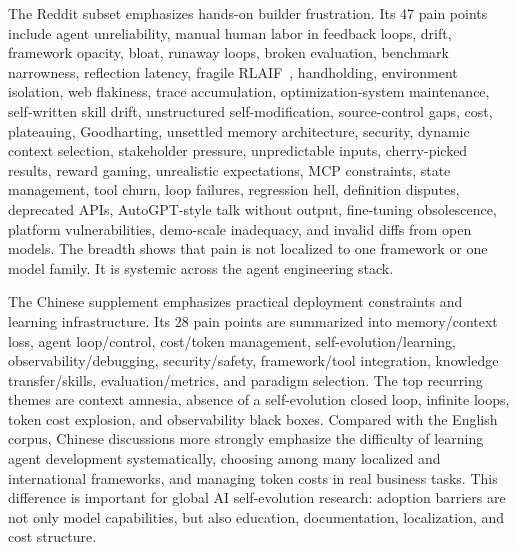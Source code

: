 The Reddit subset emphasizes hands-on builder frustration. Its 47 pain points include agent unreliability, manual human labor in feedback loops, drift, framework opacity, bloat, runaway loops, broken evaluation, benchmark narrowness, reflection latency, fragile RLAIF~\cite{constitutionalai2022}, handholding, environment isolation, web flakiness, trace accumulation, optimization-system maintenance, self-written skill drift, unstructured self-modification, source-control gaps, cost, plateauing, Goodharting, unsettled memory architecture, security, dynamic context selection, stakeholder pressure, unpredictable inputs, cherry-picked results, reward gaming, unrealistic expectations, MCP constraints, state management, tool churn, loop failures, regression hell, definition disputes, deprecated APIs, AutoGPT-style talk without output, fine-tuning obsolescence, platform vulnerabilities, demo-scale inadequacy, and invalid diffs from open models. The breadth shows that pain is not localized to one framework or one model family. It is systemic across the agent engineering stack.

The Chinese supplement emphasizes practical deployment constraints and learning infrastructure. Its 28 pain points are summarized into memory/context loss, agent loop/control, cost/token management, self-evolution/learning, observability/debugging, security/safety, framework/tool integration, knowledge transfer/skills, evaluation/metrics, and paradigm selection. The top recurring themes are context amnesia, absence of a self-evolution closed loop, infinite loops, token cost explosion, and observability black boxes. Compared with the English corpus, Chinese discussions more strongly emphasize the difficulty of learning agent development systematically, choosing among many localized and international frameworks, and managing token costs in real business tasks. This difference is important for global AI self-evolution research: adoption barriers are not only model capabilities, but also education, documentation, localization, and cost structure.

